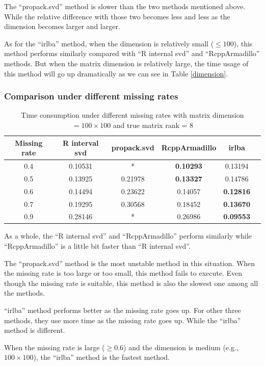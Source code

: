 \documentclass[12pt]{article}
\begin{document}
The “propack.svd” method is slower than the two methods mentioned above.  While the relative difference with those two becomes less and less as the dimension becomes larger and larger. 

As for the “irlba” method, when the dimension is relatively small ($\leq 100$), this method performs similarly compared with “R internal svd” and “RcppArmadillo” methods. But when the matrix dimension is relatively large, the time usage of this method will go up dramatically as we can see in Table \ref{dimension}.

	\subsubsection{Comparison under different missing rates}
	
	\begin{table}[ht]
		\centering
		\caption{Time consumption under different missing rates with matrix dimension $=100\times 100$ and true matrix rank = 8 }\label{missing rate}
		\begin{tabular}{cccccc}
			\hline\hline
			Missing rate & R interval svd & propack.svd & RcppArmadillo & irlba\\
			\hline
		0.4&0.10531&*&\textbf{0.10293}&0.13194\\
		0.5&0.13925&0.21978&\textbf{0.13327}&0.14786\\
		0.6&0.14494&0.23622&0.14057&\textbf{0.12816}\\
		0.7&0.19295&0.30568&0.18452&\textbf{0.13670}\\
		0.9&0.28146&*&0.26986&\textbf{0.09553}\\
			\hline\hline
		\end{tabular}
	\end{table}
	
As a whole, the “R internal svd” and “RcppArmadillo” perform similarly while “RcppArmadillo” is a little bit faster than “R internal svd”.

The “propack.svd” method is the most unstable method in this situation. When the missing rate is too large or too small, this method fails to execute. Even though the missing rate is suitable, this method is also the slowest one among all the methods.

“irlba” method performs better as the missing rate goes up. For other three methods, they use more time as the missing rate goes up. While the “irlba” method is different.

When the missing rate is large ($\geq 0.6$) and the dimension is medium (e.g., $100\times100$), the “irlba” method is the fastest method.
\end{document}

